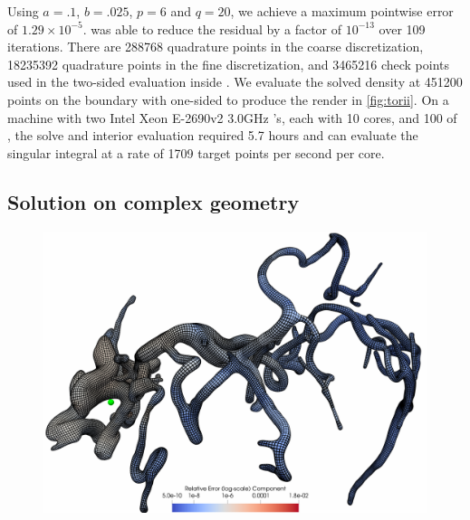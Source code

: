 Using $a=.1$, $b=.025$, $p=6$ and $q=20$, we achieve a maximum pointwise error of $1.29\times 10^{-5}$. 
\gmres was able to reduce the residual by a factor of $10^{-13}$ over 109 iterations.
There are 288768 quadrature points in the coarse discretization, 18235392 quadrature points in the fine discretization, and 3465216 check points used in the two-sided \qbkix evaluation inside \gmres.
We evaluate the solved density at 451200 points on the boundary with one-sided \qbkix to produce the render in \cref{fig:torii}.
On a machine with two Intel Xeon E-2690v2 3.0GHz 's, each with 10 cores, and 100  of ,
the \gmres solve and interior evaluation required 5.7 hours and can evaluate the singular integral at a rate of 1709 target points per second per core.


\subsection{Solution on complex geometry\label{sec:results-blood-vessel}}

\begin{figure}[!htb]
  \centering
  \hfill
  \begin{minipage}{.7\textwidth}
    \includegraphics[width=\linewidth]{figs/largest_vessel_section.png}
  \end{minipage}\hfill
\end{figure}

